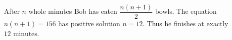 After $n$ whole minutes Bob has eaten $\dfrac{n(n+1)}{2}$ bowls. The equation $n(n+1)=156$ has positive solution $n=12$. Thus he finishes at exactly $\boxed{12\text{ minutes}}$.
